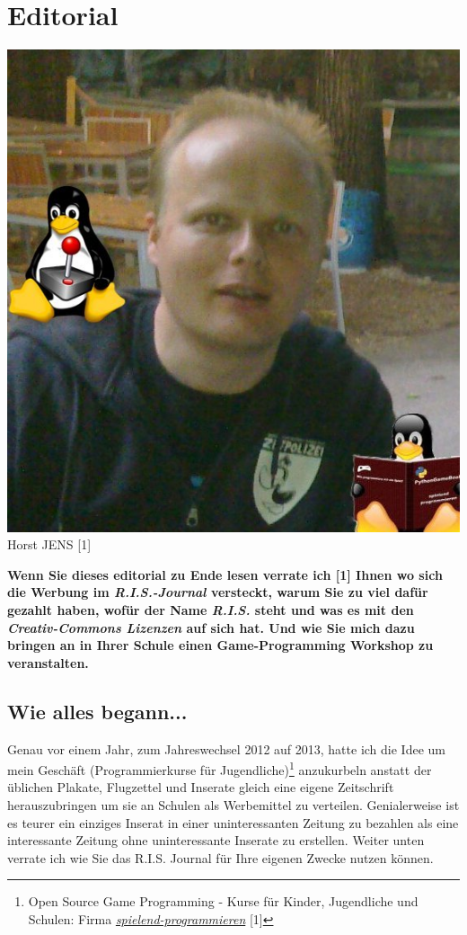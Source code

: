 \section*{Editorial} 
\label{editorial}

\begin{center}
\includegraphics[width=0.8\linewidth]{editorial/horst2011mitdoppeltux.jpg}\\ 
\footnotesize{Horst JENS [1]}
\end{center}   
\textbf{Wenn Sie dieses editorial zu Ende lesen verrate ich [1] Ihnen wo sich die Werbung im \textit{R.I.S.-Journal} versteckt, warum Sie zu viel daf\"ur gezahlt haben, wof\"ur der Name \textit{R.I.S.} steht und was es mit den \textit{Creativ-Commons Lizenzen} auf sich hat. Und wie Sie mich dazu bringen an in Ihrer Schule einen Game-Programming Workshop zu veranstalten.} 


\subsection*{Wie alles begann...}
Genau vor einem Jahr, zum Jahreswechsel 2012 auf 2013, hatte ich die Idee um mein Geschäft (Programmierkurse für Jugendliche)\footnote{Open Source Game Programming - Kurse für Kinder, Jugendliche und Schulen: Firma \href{http://spielend-programmieren.at}{\textit{spielend-programmieren}} [1]} anzukurbeln anstatt der üblichen Plakate, Flugzettel und Inserate gleich eine eigene Zeitschrift herauszubringen um sie an Schulen als Werbemittel zu verteilen. Genialerweise ist es teurer ein einziges Inserat in einer uninteressanten Zeitung zu bezahlen als eine interessante Zeitung ohne uninteressante Inserate zu erstellen. Weiter unten verrate ich wie Sie das R.I.S. Journal für Ihre eigenen Zwecke nutzen können.

